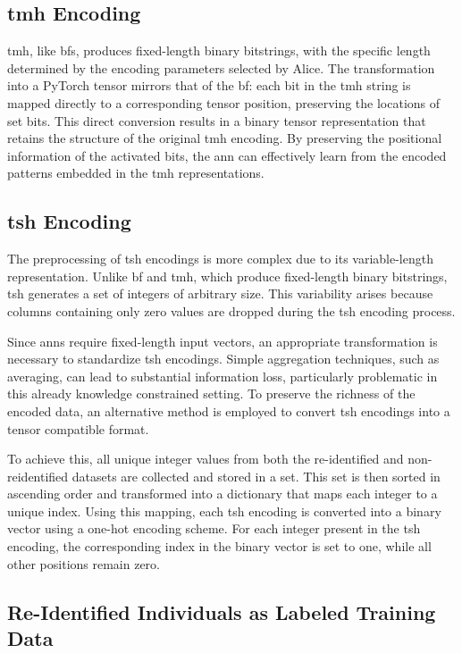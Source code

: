 \subsection{\ac{tmh} Encoding}

\ac{tmh}, like \acp{bf}, produces fixed-length binary bitstrings, with the specific length determined by the encoding parameters selected by Alice.
The transformation into a PyTorch tensor mirrors that of the \ac{bf}: each bit in the \ac{tmh} string is mapped directly to a corresponding tensor position, preserving the locations of set bits.
This direct conversion results in a binary tensor representation that retains the structure of the original \ac{tmh} encoding.
By preserving the positional information of the activated bits, the \ac{ann} can effectively learn from the encoded patterns embedded in the \ac{tmh} representations.

\subsection{\ac{tsh} Encoding}

The preprocessing of \ac{tsh} encodings is more complex due to its variable-length representation.
Unlike \ac{bf} and \ac{tmh}, which produce fixed-length binary bitstrings, \ac{tsh} generates a set of integers of arbitrary size.
This variability arises because columns containing only zero values are dropped during the \ac{tsh} encoding process.

Since \acp{ann} require fixed-length input vectors, an appropriate transformation is necessary to standardize \ac{tsh} encodings.
Simple aggregation techniques, such as averaging, can lead to substantial information loss, particularly problematic in this already knowledge constrained setting.
To preserve the richness of the encoded data, an alternative method is employed to convert \ac{tsh} encodings into a tensor compatible format.

To achieve this, all unique integer values from both the re-identified and non-reidentified datasets are collected and stored in a set.
This set is then sorted in ascending order and transformed into a dictionary that maps each integer to a unique index.
Using this mapping, each \ac{tsh} encoding is converted into a binary vector using a one-hot encoding scheme.
For each integer present in the \ac{tsh} encoding, the corresponding index in the binary vector is set to one, while all other positions remain zero.

\subsection{Re-Identified Individuals as Labeled Training Data}

